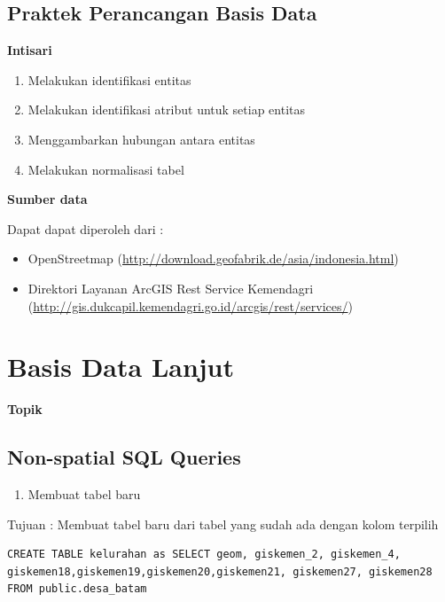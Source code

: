\documentclass[]{book}
\providecommand{\tightlist}{%
  \setlength{\itemsep}{0pt}\setlength{\parskip}{0pt}}
\begin{document}
\hypertarget{praktek-perancangan-basis-data}{%
\section{Praktek Perancangan Basis Data}\label{praktek-perancangan-basis-data}}

\textbf{Intisari}

\begin{enumerate}
\def\labelenumi{\arabic{enumi}.}
\item
  Melakukan identifikasi entitas
\item
  Melakukan identifikasi atribut untuk setiap entitas
\item
  Menggambarkan hubungan antara entitas
\item
  Melakukan normalisasi tabel
\end{enumerate}

\textbf{Sumber data}

Dapat dapat diperoleh dari :

\begin{itemize}
\item
  OpenStreetmap (\url{http://download.geofabrik.de/asia/indonesia.html})
\item
  Direktori Layanan ArcGIS Rest Service Kemendagri (\url{http://gis.dukcapil.kemendagri.go.id/arcgis/rest/services/})
\end{itemize}

\hypertarget{basis-data-lanjut}{%
\chapter{Basis Data Lanjut}\label{basis-data-lanjut}}

\textbf{Topik}

\hypertarget{non-spatial-sql-queries}{%
\section{Non-spatial SQL Queries}\label{non-spatial-sql-queries}}

\begin{enumerate}
\def\labelenumi{\arabic{enumi}.}
\tightlist
\item
  Membuat tabel baru
\end{enumerate}

Tujuan : Membuat tabel baru dari tabel yang sudah ada dengan kolom terpilih

\begin{verbatim}
CREATE TABLE kelurahan as SELECT geom, giskemen_2, giskemen_4, giskemen18,giskemen19,giskemen20,giskemen21, giskemen27, giskemen28 FROM public.desa_batam
\end{verbatim}
\end{document}

